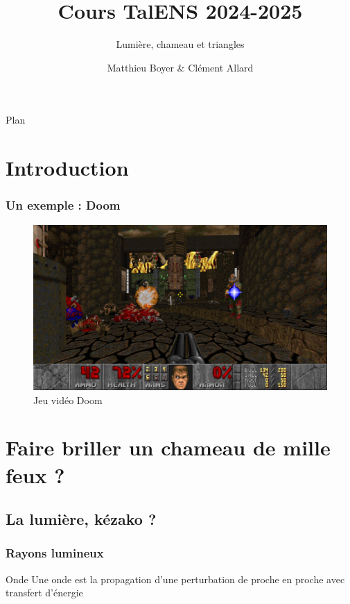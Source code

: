 \documentclass{beamercours}
\title{Cours TalENS 2024-2025}
\subtitle{Lumière, chameau et triangles}
\author{Matthieu Boyer \& Clément Allard}
\begin{document}
\maketitle
\begin{frame}{Plan}\tableofcontents[sectionstyle=show]
\end{frame}

\section*{Introduction}

\begin{frame}
	\frametitle{Un exemple : Doom}
    \begin{figure}
        \includegraphics[scale = .07]{Doom.jpg}
        \caption{Jeu vidéo Doom}
    \end{figure}
\end{frame}

\section{Faire briller un chameau de mille feux ?}
\subsection{La lumière, kézako ?}

\begin{frame}
	\frametitle{Rayons lumineux}
\begin{définition}{Onde}{}
Une onde est la propagation d'une perturbation de proche en proche avec transfert d'énergie
\end{définition}

\end{frame}
\end{document}
